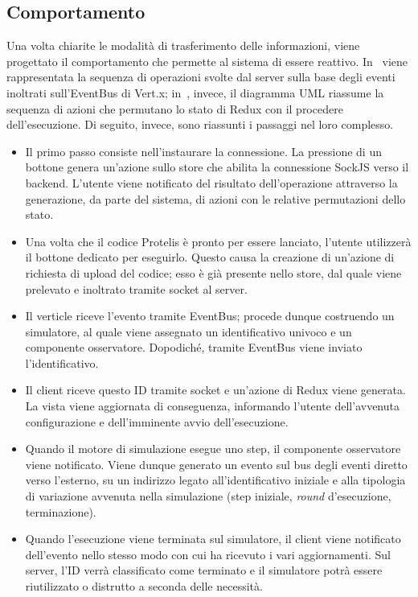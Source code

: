     \subsection{Comportamento}

      Una volta chiarite le modalità di trasferimento delle informazioni, viene progettato il comportamento che permette al sistema di essere reattivo.
      In~ viene rappresentata la sequenza di operazioni svolte dal server sulla base degli eventi inoltrati sull'EventBus di Vert.x;
      in~, invece, il diagramma UML riassume la sequenza di azioni che permutano lo stato di Redux con il procedere dell'esecuzione.
      Di seguito, invece, sono riassunti i passaggi nel loro complesso.

      \begin{itemize}
        \item
          Il primo passo consiste nell'instaurare la connessione.
          La pressione di un bottone genera un'azione sullo store che abilita la connessione SockJS verso il backend.
          L'utente viene notificato del risultato dell'operazione attraverso la generazione, da parte del sistema, di azioni con le relative permutazioni dello stato.
        \item
          Una volta che il codice Protelis è pronto per essere lanciato, l'utente utilizzerà il bottone dedicato per eseguirlo.
          Questo causa la creazione di un'azione di richiesta di upload del codice;
          esso è già presente nello store, dal quale viene prelevato e inoltrato tramite socket al server.
        \item
          Il verticle riceve l'evento tramite EventBus;
          procede dunque costruendo un simulatore, al quale viene assegnato un identificativo univoco e un componente osservatore.
          Dopodiché, tramite EventBus viene inviato l'identificativo.
        \item
          Il client riceve questo ID tramite socket e un'azione di Redux viene generata.
          La vista viene aggiornata di conseguenza, informando l'utente dell'avvenuta configurazione e dell'imminente avvio dell'esecuzione.
        \item
          Quando il motore di simulazione esegue uno step, il componente osservatore viene notificato.
          Viene dunque generato un evento sul bus degli eventi diretto verso l'esterno, su un indirizzo legato all'identificativo iniziale e alla tipologia di variazione avvenuta nella simulazione (step iniziale, \emph{round} d'esecuzione, terminazione).
        \item
          Quando l'esecuzione viene terminata sul simulatore, il client viene notificato dell'evento nello stesso modo con cui ha ricevuto i vari aggiornamenti.
          Sul server, l'ID verrà classificato come terminato e il simulatore potrà essere riutilizzato o distrutto a seconda delle necessità.
      \end{itemize}

